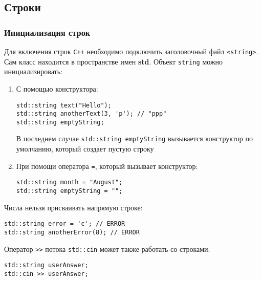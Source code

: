 \subsection{Строки}
\subsubsection{Инициализация строк}
Для включения строк \texttt{C++} необходимо подключить заголовочный файл \lstinline|<string>|. Сам класс находится в пространстве имен \textbf{std}. Объект \lstinline|string| можно инициализировать:

\begin{enumerate}
    \item С помощью конструктора:
    \begin{lstlisting}
std::string text("Hello");
std::string anotherText(3, 'p'); // "ppp"
std::string emptyString;
    \end{lstlisting}

    В последнем случае \lstinline|std::string emptyString| вызывается конструктор по умолчанию, который создает пустую строку
    \item При помощи оператора \lstinline{=}, который вызывает конструктор:
    \begin{lstlisting}
std::string month = "August";
std::string emptyString = "";
    \end{lstlisting}
\end{enumerate}

Числа нельзя присваивать напрямую строке:
\begin{lstlisting}
std::string error = 'c'; // ERROR
std::string anotherError(8); // ERROR
\end{lstlisting}

Оператор \lstinline|>>| потока \lstinline|std::cin| может также работать со строками:
\begin{lstlisting}
std::string userAnswer;
std::cin >> userAnswer;
\end{lstlisting}


